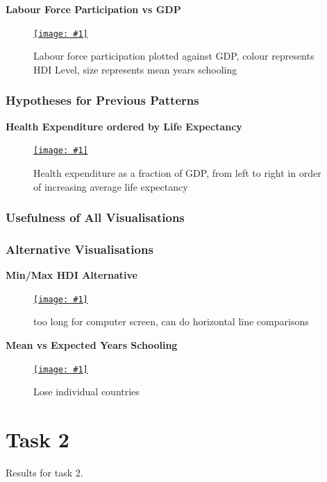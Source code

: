 \documentclass[11pt,a4paper,final]{article}
\newcommand\onlinefig[3]{
\begin{figure}[H]
  \centering
  \href{#3}{\texttt{[image: \#1]}}
  \caption{#2} 
  \label{fig:#1}
\end{figure}
}
\begin{document}
\begin{multicols}{2}
\begin{flushleft}
\textbf{Labour Force Participation vs GDP}
\end{flushleft}
\onlinefig{labour_force_participation_vs_gdp_scatterplot}{Labour force participation plotted against GDP, colour represents HDI Level, size represents mean years schooling}{https://public.tableau.com/views/CS3205-HDI/Sheet13?:language=en-GB&:display_count=n&:origin=viz_share_link}

\subsubsection{Hypotheses for Previous Patterns}
\begin{flushleft}
\textbf{Health Expenditure ordered by Life Expectancy}
\end{flushleft}
\onlinefig{health_expenditure_ordered_by_life_expectancy}{Health expenditure as a fraction of GDP, from left to right in order of increasing average life expectancy}{https://public.tableau.com/views/CS3205-HDI/Sheet9?:language=en-GB&:display_count=n&:origin=viz_share_link}

\subsubsection{Usefulness of All Visualisations}


\subsubsection{Alternative Visualisations}
\begin{flushleft}
\textbf{Min/Max HDI Alternative}
\end{flushleft}
\onlinefig{min_vs_max_hdi_sidebysidecircleplot}{too long for computer screen, can do horizontal line comparisons}{https://public.tableau.com/views/CS3205_hdi_csv/Sheet1?:language=en-GB&:display_count=n&:origin=viz_share_link}

\begin{flushleft}
\textbf{Mean vs Expected Years Schooling}
\end{flushleft}
\onlinefig{mean_vs_expected_years_schooling_bar_and_linegraph}{Lose individual countries}{https://public.tableau.com/views/CS3205-HDI/Sheet4?:language=en-GB&:display_count=n&:origin=viz_share_link}

\end{multicols}
\pagebreak


\section{Task 2}
Results for task 2.
\end{document}
